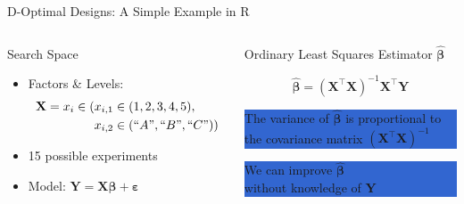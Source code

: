 \documentclass[10pt, compress, aspectratio=169, xcolor={table,usenames,dvipsnames}]{beamer}
\begin{document}
\begin{frame}[label={sec:orgee4fd1d}]{D-Optimal Designs: A Simple Example in R}
\begin{columns}
\begin{column}{0.5\columnwidth}
\begin{block}{Search Space}
\begin{itemize}
\item Factors \& Levels:
\begin{align*}
\mathbf{X} = x_i \in (x_{i,1} \in & \; (1, 2, 3, 4, 5), \\
x_{i,2} \in & \; (``A", ``B", ``C"))
\end{align*}
\item 15 possible experiments
\item Model: \(\mathbf{Y} = \mathbf{X}\bm{\beta} + \bm{\varepsilon}\)
\end{itemize}
\end{block}
\end{column}

\begin{column}{0.5\columnwidth}
\begin{block}{Ordinary Least Squares Estimator \(\bm{\hat{\beta}}\)}
\begin{center}
\begin{equation*}
\bm{\hat{\beta}} = \left(\bm{X}^{\intercal}\bm{X}\right)^{-1}\bm{X}^{\intercal}\bm{Y}
\end{equation*}
\end{center}

\begin{center}
\colorbox{Highlight}{\parbox[c]{0.8\columnwidth}{\centering   The  variance   of
    $\bm{\hat{\beta}}$  is  \alert{proportional}  to \\  the  covariance  matrix
    $\left(\bm{X}^{\intercal}\bm{X}\right)^{-1}$}}

\pause

\colorbox{Highlight}{\parbox[c]{0.8\columnwidth}{\centering   We   can   improve
    $\bm{\hat{\beta}}$ \\ \alert{without knowledge} of $\bm{Y}$}}
\end{center}
\end{block}
\end{column}
\end{columns}
\end{frame}
\end{document}
